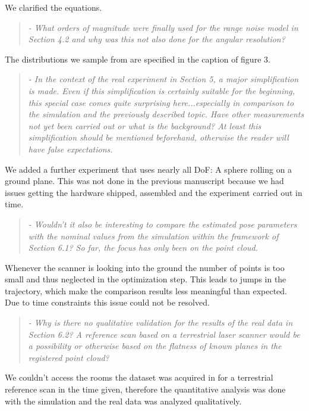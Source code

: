 \documentclass{article}
\newenvironment{itquote}
  {\begin{quote}\itshape}
  {\end{quote}\ignorespacesafterend}
\begin{document}
We clarified the equations.

\begin{itquote} 
- What orders of magnitude were finally used for the range noise
model in Section 4.2 and why was this not also done for the angular
resolution?
\end{itquote}

The distributions we sample from are specified in the caption of 
figure 3. 

\begin{itquote}
- In the context of the real experiment in Section 5, a major
simplification is made. Even if this simplification is certainly
suitable for the beginning, this special case comes quite surprising
here...especially in comparison to the simulation and the previously
described topic. Have other measurements not yet been carried out or
what is the background? At least this simplification should be
mentioned beforehand, otherwise the reader will have false
expectations.
\end{itquote}

We added a further experiment that uses nearly all DoF: A sphere rolling
on a ground plane. This was not done in the previous manuscript because
we had issues getting the hardware shipped, assembled and the experiment 
carried out in time.

\begin{itquote}
- Wouldn't it also be interesting to compare the estimated pose
parameters with the nominal values from the simulation within the
framework of Section 6.1? So far, the focus has only been on the
point cloud.
\end{itquote}

Whenever the scanner is looking into the ground the number of points is too small
and thus neglected in the optimization step. This leads to jumps in the
trajectory, which make the comparison results less meaningful than expected. Due to time constraints this issue could not be resolved.

\begin{itquote}
- Why is there no qualitative validation for the results of the real
data in Section 6.2? A reference scan based on a terrestrial laser
scanner would be a possibility or otherwise based on the flatness of
known planes in the registered point cloud?
\end{itquote}

We couldn't access the rooms the dataset was acquired in for a terrestrial 
reference scan in the time given, therefore the quantitative analysis was done with the simulation and the real data was analyzed qualitatively.
\end{document}
